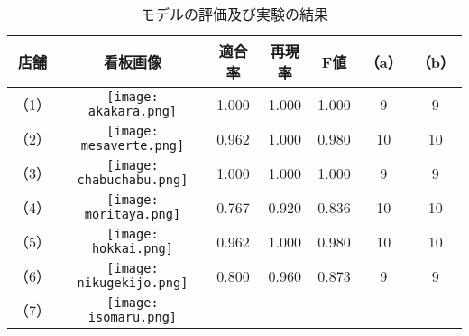   \begin{table}[t]
    \caption{モデルの評価及び実験の結果}
    \label{table:recog_result}
    \begin{center}
      \begin{tabular}{cc|ccc|cc}
        \hline\hline
        \textbf{店舗} & \textbf{看板画像} & \textbf{適合率} & \textbf{再現率} & \textbf{F値} & \textbf{（a）} & \textbf{（b）} \\ \hline
        （1） & 
        \begin{minipage}{40mm}
          \centering
          \texttt{[image: akakara.png]}
        \end{minipage} & 
        1.000 & 1.000 & 1.000 & %
        9 & 9 \\
        （2） & 
        \begin{minipage}{40mm}
          \centering
          \texttt{[image: mesaverte.png]}
        \end{minipage} &
        0.962 & 1.000 & 0.980 & %
        10 & 10 \\
        （3） & 
        \begin{minipage}{40mm}
          \centering
          \texttt{[image: chabuchabu.png]}
        \end{minipage} &
        1.000 & 1.000 & 1.000 & %
        9 & 9 \\
        （4） & 
        \begin{minipage}{40mm}
          \centering
          \texttt{[image: moritaya.png]}
        \end{minipage} & 
        0.767 & 0.920 & 0.836 & %
        10 & 10 \\
        （5） & 
        \begin{minipage}{40mm}
          \centering
          \texttt{[image: hokkai.png]}
        \end{minipage} & 
        0.962 & 1.000 & 0.980 & %
        10 & 10 \\
        （6） & 
        \begin{minipage}{40mm}
          \centering
          \texttt{[image: nikugekijo.png]}
        \end{minipage} &
        0.800 & 0.960 & 0.873 & %
        9 & 9 \\
        （7） & 
        \begin{minipage}{40mm}
          \centering
          \texttt{[image: isomaru.png]}

\end{minipage}
\end{tabular}
\end{center}
\end{table}
